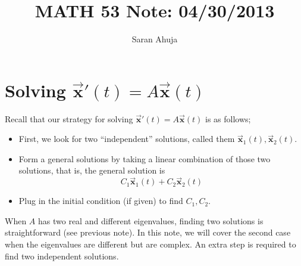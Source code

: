 \documentclass[10pt]{amsart}
\title{MATH 53 Note: 04/30/2013}
\author{Saran Ahuja}
\newcommand{\vecx}{\vec{\mathbf{x}}}
\begin{document}
\maketitle
\section{Solving $\vecx'(t) = A\vecx(t)$}

Recall that our strategy for solving $\vecx'(t) = A\vecx(t)$ is as follows;

\begin{itemize}
	\item First, we look for two ``independent'' solutions, called them $ \vecx_{1}(t),\vecx_{2}(t)$.
	\item Form a general solutions by taking a linear combination of those two solutions, that is, the general solution is
	$$  C_{1}\vecx_{1}(t)+C_{2}\vecx_{2}(t)  $$
	\item Plug in the initial condition (if given) to find $C_{1},C_{2}$. 
\end{itemize}

When $A$ has two real and different eigenvalues, finding two solutions is straightforward (see previous note). In this note, we will cover the second case when the eigenvalues are different but are complex. An extra step is required to find two independent solutions.
\end{document}
